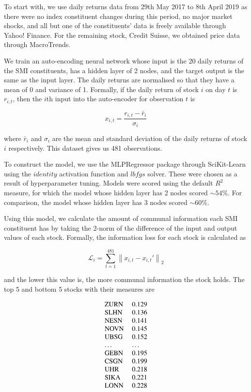 \documentclass[review]{elsarticle}
\begin{document}
To start with, we use daily returns data from 29th May 2017 to 8th April 2019 as there were no index constituent changes during this period, no major market shocks, and all but one of the constituents' data is freely available through Yahoo! Finance. For the remaining stock, Credit Suisse, we obtained price data through MacroTrends.

We train an auto-encoding neural network whose input is the 20 daily returns of the SMI constituents, has a hidden layer of 2 nodes, and the target output is the same as the input layer. The daily returns are normalised so that they have a mean of 0 and variance of 1. Formally, if the daily return of stock $i$ on day $t$ is $r_{i,t}$, then the $i$th input into the auto-encoder for observation $t$ is

$$x_{i,t} = \frac{r_{i,t} - \bar{r}_i}{\sigma_i}$$

where $\bar{r}_i$ and $\sigma_i$ are the mean and standard deviation of the daily returns of stock $i$ respectively. This dataset gives us 481 observations.

To construct the model, we use the MLPRegressor package through SciKit-Learn using the $\textit{identity}$ activation function and $\textit{lbfgs}$ solver. These were chosen as a result of hyperparameter tuning. Models were scored using the default $R^2$ measure, for which the model whose hidden layer has 2 nodes scored $\sim$$54\%$. For comparison, the model whose hidden layer has 3 nodes scored $\sim$$60\%$.

Using this model, we calculate the amount of communal information each SMI constituent has by taking the 2-norm of the difference of the input and output values of each stock. Formally, the information loss for each stock is calculated as

$$\mathcal{L}_i = \sum_{t=1}^{481} \left\| x_{i,t} - x_{i,t}' \right\|_2$$

and the lower this value is, the more communal information the stock holds. The top 5 and bottom 5 stocks with their measures are

$$\begin{tabular}{l l}
\text{ZURN}& 0.129 \\
\text{SLHN}& 0.136 \\
\text{NESN}& 0.141 \\
\text{NOVN}& 0.145 \\
\text{UBSG}& 0.152 \\
\dots & \dots \\
\text{GEBN}& 0.195 \\
\text{CSGN}& 0.199 \\
\text{UHR}& 0.218 \\
\text{SIKA}& 0.221 \\
\text{LONN}& 0.228 \\
\end{tabular}$$
\end{document}

